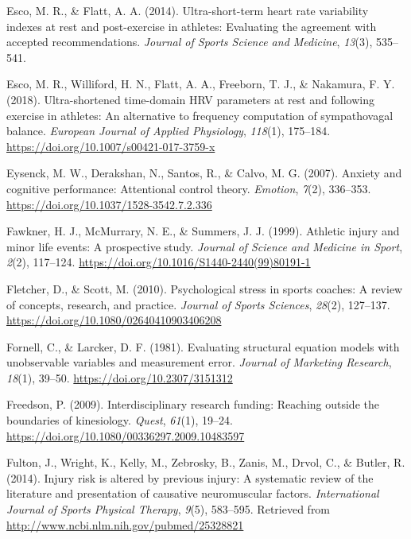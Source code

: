 \documentclass[
  english,
  man,floatsintext]{apa6}
\begin{document}
\leavevmode\hypertarget{ref-Esco2014}{}%
Esco, M. R., \& Flatt, A. A. (2014). Ultra-short-term heart rate variability indexes at rest and post-exercise in athletes: Evaluating the agreement with accepted recommendations. \emph{Journal of Sports Science and Medicine}, \emph{13}(3), 535--541.

\leavevmode\hypertarget{ref-Esco2018}{}%
Esco, M. R., Williford, H. N., Flatt, A. A., Freeborn, T. J., \& Nakamura, F. Y. (2018). Ultra-shortened time-domain HRV parameters at rest and following exercise in athletes: An alternative to frequency computation of sympathovagal balance. \emph{European Journal of Applied Physiology}, \emph{118}(1), 175--184. \url{https://doi.org/10.1007/s00421-017-3759-x}

\leavevmode\hypertarget{ref-Eysenck2007}{}%
Eysenck, M. W., Derakshan, N., Santos, R., \& Calvo, M. G. (2007). Anxiety and cognitive performance: Attentional control theory. \emph{Emotion}, \emph{7}(2), 336--353. \url{https://doi.org/10.1037/1528-3542.7.2.336}

\leavevmode\hypertarget{ref-Fawkner1999}{}%
Fawkner, H. J., McMurrary, N. E., \& Summers, J. J. (1999). Athletic injury and minor life events: A prospective study. \emph{Journal of Science and Medicine in Sport}, \emph{2}(2), 117--124. \url{https://doi.org/10.1016/S1440-2440(99)80191-1}

\leavevmode\hypertarget{ref-Fletcher2010}{}%
Fletcher, D., \& Scott, M. (2010). Psychological stress in sports coaches: A review of concepts, research, and practice. \emph{Journal of Sports Sciences}, \emph{28}(2), 127--137. \url{https://doi.org/10.1080/02640410903406208}

\leavevmode\hypertarget{ref-Fornell1981}{}%
Fornell, C., \& Larcker, D. F. (1981). Evaluating structural equation models with unobservable variables and measurement error. \emph{Journal of Marketing Research}, \emph{18}(1), 39--50. \url{https://doi.org/10.2307/3151312}

\leavevmode\hypertarget{ref-Freedson2009}{}%
Freedson, P. (2009). Interdisciplinary research funding: Reaching outside the boundaries of kinesiology. \emph{Quest}, \emph{61}(1), 19--24. \url{https://doi.org/10.1080/00336297.2009.10483597}

\leavevmode\hypertarget{ref-Fulton2014}{}%
Fulton, J., Wright, K., Kelly, M., Zebrosky, B., Zanis, M., Drvol, C., \& Butler, R. (2014). Injury risk is altered by previous injury: A systematic review of the literature and presentation of causative neuromuscular factors. \emph{International Journal of Sports Physical Therapy}, \emph{9}(5), 583--595. Retrieved from \url{http://www.ncbi.nlm.nih.gov/pubmed/25328821}
\end{document}
